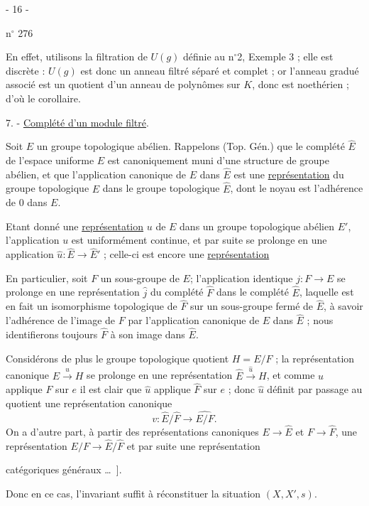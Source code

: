 \begin{center}- 16 -\end{center}
\hfill n$^\circ$ 276

En effet, utilisons la filtration de $U(g)$ définie au n$^\circ$2, Exemple 3 ; elle est discrète : $U(g)$ est donc un anneau filtré séparé et complet ; or l'anneau gradué associé est un quotient d'un anneau de polynômes sur $K$, donc est noethérien ; d'où le corollaire.

7. - \uline{Complété d'un module filtré}.

Soit $E$ un groupe topologique abélien. Rappelons (Top. Gén.) que le complété $\hat E$ de l'espace uniforme $E$ est canoniquement muni d'une structure de groupe abélien, et que l'application canonique de $E$ dans $\hat E$ est une \uline{représentation} du groupe topologique $E$ dans le groupe topologique $\hat E$, dont le noyau est l'adhérence de 0 dans $E$.

Etant donné une \uline{représentation} $u$ de $E$ dans un groupe topologique abélien $E'$, l'application $u$ est uniformément continue, et par suite se prolonge en une application $\hat u:\hat E\longrightarrow\hat E'$ ; celle-ci est encore une \uline{représentation}

En particulier, soit $F$ un sous-groupe de $E$; l'application identique $j:F\longrightarrow E$ se prolonge en une représentation $\hat j$ du complété $\hat F$ dans le complété $\hat E$, laquelle est en fait un isomorphisme topologique de $\hat F$ sur un sous-groupe fermé de $\hat E$, à savoir l'adhérence de l'image de $F$ par l'application canonique de $E$ dans $\hat E$ ; nous identifierons toujours $\hat F$ à son image dans $\hat E$.

Considérons de plus le groupe topologique quotient $H=E/F$ ; la représentation canonique $E\xrightarrow{u}H$ se prolonge en une représentation $\hat E\xrightarrow{\hat u}H$, et comme $u$ applique $F$ sur $e$ il est clair que $\hat u$ applique $\hat F$ sur $e$ ; donc $\hat u$ définit par passage au quotient une représentation canonique
\[
v:\hat E/\hat F\longrightarrow\widehat{E/F}.
\]
On a d'autre part, à partir des représentations canoniques $E\to\hat E$ et $F\longrightarrow\hat F$, une représentation $E/F\to\hat E/\hat F$ et par suite une représentation

catégoriques généraux \ldots\ ].

Donc en ce cas, l'invariant suffit à réconstituer  la situation $(X,X',s)$.

